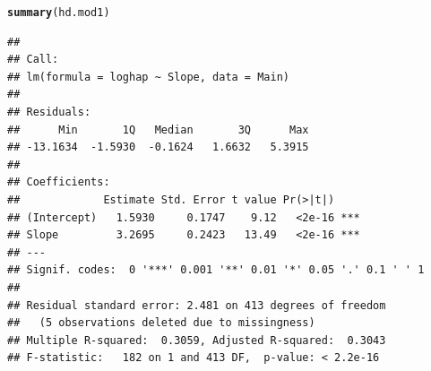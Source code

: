 \documentclass[12pt]{article}\usepackage[]{graphicx}\usepackage[]{color}
\makeatletter
\newcommand{\hlstd}[1]{\textcolor[rgb]{0.345,0.345,0.345}{#1}}%
\newcommand{\hlkwd}[1]{\textcolor[rgb]{0.737,0.353,0.396}{\textbf{#1}}}%
\newenvironment{kframe}{%
 \def\at@end@of@kframe{}%
 \ifinner\ifhmode%
  \def\at@end@of@kframe{\end{minipage}}%
  \begin{minipage}{\columnwidth}%
 \fi\fi%
 \def\FrameCommand##1{\hskip\@totalleftmargin \hskip-\fboxsep
 \colorbox{shadecolor}{##1}\hskip-\fboxsep
     \hskip-\linewidth \hskip-\@totalleftmargin \hskip\columnwidth}%
 \MakeFramed {\advance\hsize-\width
   \@totalleftmargin\z@ \linewidth\hsize
   \@setminipage}}%
 {\par\unskip\endMakeFramed%
 \at@end@of@kframe}
\newenvironment{knitrout}{}{} %
\makeatother
\begin{document}
\begin{knitrout}
\begin{kframe}\begin{alltt}
\hlkwd{summary}\hlstd{(hd.mod1)}
\end{alltt}
\begin{verbatim}
## 
## Call:
## lm(formula = loghap ~ Slope, data = Main)
## 
## Residuals:
##      Min       1Q   Median       3Q      Max 
## -13.1634  -1.5930  -0.1624   1.6632   5.3915 
## 
## Coefficients:
##             Estimate Std. Error t value Pr(>|t|)    
## (Intercept)   1.5930     0.1747    9.12   <2e-16 ***
## Slope         3.2695     0.2423   13.49   <2e-16 ***
## ---
## Signif. codes:  0 '***' 0.001 '**' 0.01 '*' 0.05 '.' 0.1 ' ' 1
## 
## Residual standard error: 2.481 on 413 degrees of freedom
##   (5 observations deleted due to missingness)
## Multiple R-squared:  0.3059,	Adjusted R-squared:  0.3043 
## F-statistic:   182 on 1 and 413 DF,  p-value: < 2.2e-16
\end{verbatim}
\end{kframe}
\end{knitrout}
\end{document}
